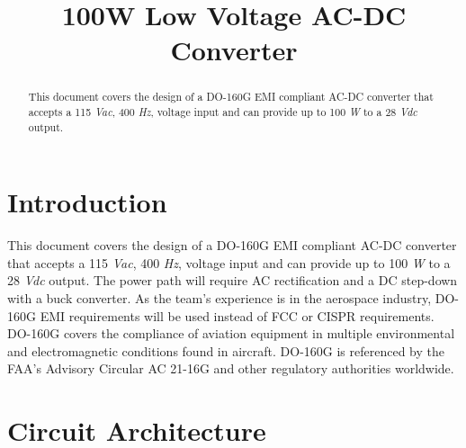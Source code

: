 \documentclass[conference]{IEEEtran}
\begin{document}
\title{100W Low Voltage AC-DC Converter\\}


\author{
\and
{}
\and
{}
}

\maketitle

\begin{abstract}
This document covers the design of a DO-160G EMI compliant AC-DC converter that accepts a 115 \textit{Vac}, 400 \textit{Hz}, voltage input
and can provide up to 100 \textit{W} to a 28 \textit{Vdc} output.
\end{abstract}

\section{Introduction}
This document covers the design of a DO-160G EMI compliant AC-DC converter that accepts a 115 \textit{Vac}, 400 \textit{Hz}, voltage input
and can provide up to 100 \textit{W} to a 28 \textit{Vdc} output. The power path will require AC rectification and a DC step-down with a buck converter. As the team's experience is in the aerospace industry, DO-160G EMI requirements will be used instead of FCC or CISPR requirements. DO-160G covers the compliance of aviation equipment in multiple environmental and electromagnetic conditions found in aircraft. DO-160G is referenced by the FAA’s Advisory Circular AC 21-16G and other regulatory authorities worldwide.

\section{Circuit Architecture}
\end{document}
